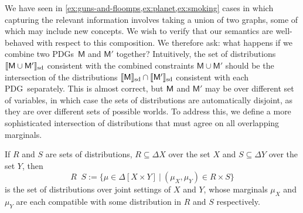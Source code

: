 \documentclass{article}
\newcommand{\notation}[2][]{#1}
\renewcommand{\notation}[2][]{{\color{notationcolor} #2}}
\newcommand\SD{_{\text{sd}}}
\DeclareMathOperator\dcap{\mathop{\dot\cap}}
\newcommand{\sfM}{\mathsf M}
\newcommand{\MN}{PDG}
\newcommand{\MNs}{\MN s}
\numberwithin{equation}{section}
\begin{document}
\begin{revising}
	We have seen
        in \cref{ex:guns-and-floomps,ex:planet,ex:smoking} cases in
        which capturing the relevant information involves taking a
        union of two graphs, some of which may include new
        concepts. We wish to verify that our semantics are
        well-behaved with respect to this composition.	  
	We therefore ask: what happens if we combine two \MNs\ $\sfM$
        and $\sfM'$ together? Intuitively, the set of distributions
        $\bbr{\sfM \cup \sfM'}\SD$ consistent with the combined
        constraints $\sfM\cup \sfM'$ should be the intersection of the
        distributions $\bbr{\sfM}\SD \cap \bbr{\sfM'}\SD$ consistent
        with each \MN\ separately. This is almost correct, but $\sf M$
        and $\sfM'$ may be over different set of variables, in which
        case the sets of distributions are automatically disjoint, as
        they are over different sets of possible worlds. To address
        this, we define a more sophisticated intersection of
        distributions that must agree on all overlapping
        marginals. %
	
	\begin{defn}[$\dcap$]\label{def:marginal-dist-intersection}
		If $R$ and $S$ are sets of distributions, $R \subseteq \Delta X$ over the set $X$ and $S\subseteq \Delta Y$ over the set $Y$, then
			{$$R \dcap S := \Big\{ \mu \in  \Delta [X \!\times\! Y] ~\Big|~ (\mu_{X}, \mu_{Y}) \in R \times S \Big\}  $$}%
		is the set of distributions over joint settings of $X$ and $Y$, whose marginals $\mu_X$ and $\mu_Y$ are each compatible with some distribution in $R$ and $S$ respectively. 
		

\end{defn}
\end{revising}
\end{document}
